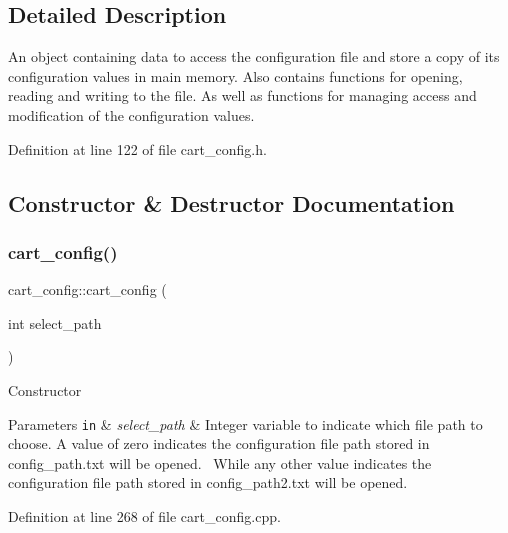 \subsection{Detailed Description}
An object containing data to access the configuration file and store a copy of its configuration values in main memory. Also contains functions for opening, reading and writing to the file. As well as functions for managing access and modification of the configuration values. 

Definition at line 122 of file cart\+\_\+config.\+h.



\subsection{Constructor \& Destructor Documentation}
\mbox{\label{classcart__config_a080069ffff0306121fc494e37b05fdd7}} 
\subsubsection{\texorpdfstring{cart\+\_\+config()}{cart\_config()}}
{\footnotesize\ttfamily cart\+\_\+config\+::cart\+\_\+config (\begin{DoxyParamCaption}\item[{int}]{select\+\_\+path }\end{DoxyParamCaption})}

Constructor 
\begin{DoxyParams}[1]{Parameters}
\mbox{\tt in}  & {\em select\+\_\+path} & Integer variable to indicate which file path to choose. A value of zero indicates the configuration file path stored in config\+\_\+path.\+txt will be opened.~\newline
 While any other value indicates the configuration file path stored in config\+\_\+path2.\+txt will be opened. \\
\hline
\end{DoxyParams}


Definition at line 268 of file cart\+\_\+config.\+cpp.

\mbox{\label{classcart__config_ae9aafdb5141c1e8851700c72d083fc9b}} 
